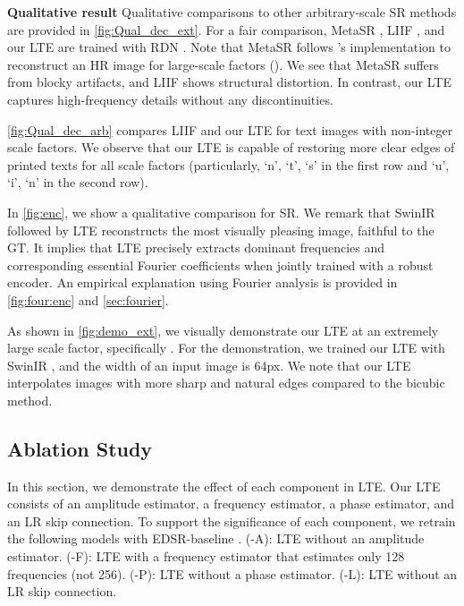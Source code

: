 \documentclass[10pt,twocolumn,letterpaper]{article}
\begin{document}
\textbf{Qualitative result} Qualitative comparisons to other arbitrary-scale SR methods are provided in \cref{fig:Qual_dec_ext}. For a fair comparison, MetaSR \cite{hu2019meta}, LIIF \cite{chen2021learning}, and our LTE are trained with RDN \cite{zhang2018residual}. Note that MetaSR \cite{hu2019meta} follows \cite{chen2021learning}'s implementation to reconstruct an HR image for large-scale factors (). We see that MetaSR suffers from blocky artifacts, and LIIF shows structural distortion. In contrast, our LTE captures high-frequency details without any discontinuities.

\cref{fig:Qual_dec_arb} compares LIIF \cite{chen2021learning} and our LTE for text images with non-integer scale factors. We observe that our LTE is capable of restoring more clear edges of printed texts for all scale factors (particularly, `n', `t', `s' in the first row and `u', `i', `n' in the second row).

In \cref{fig:enc}, we show a qualitative comparison for  SR. We remark that SwinIR \cite{liang2021swinir} followed by LTE reconstructs the most visually pleasing image, faithful to the GT. It implies that LTE precisely extracts dominant frequencies and corresponding essential Fourier coefficients when jointly trained with a robust encoder. An empirical explanation using Fourier analysis is provided in \cref{fig:four:enc} and \cref{sec:fourier}.

As shown in \cref{fig:demo_ext}, we visually demonstrate our LTE at an extremely large scale factor, specifically . For the demonstration, we trained our LTE with SwinIR \cite{liang2021swinir}, and the width of an input image is 64px. We note that our LTE interpolates images with more sharp and natural edges compared to the bicubic method.


\subsection{Ablation Study}
\label{sec:abl}
In this section, we demonstrate the effect of each component in LTE. Our LTE consists of an amplitude estimator, a frequency estimator, a phase estimator, and an LR skip connection. To support the significance of each component, we retrain the following models with EDSR-baseline \cite{Lim_2017_CVPR_Workshops}. (-A): LTE without an amplitude estimator. (-F): LTE with a frequency estimator that estimates only 128 frequencies (not 256). (-P): LTE without a phase estimator. (-L): LTE without an LR skip connection.
\end{document}
